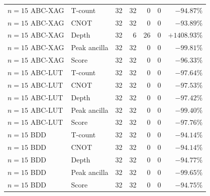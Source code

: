 \begin{tabular}{llrrrrr}
$n=15$ ABC-XAG & T-count & 32 & 32 & 0 & 0 & $-94.87\%$ \\
$n=15$ ABC-XAG & CNOT & 32 & 32 & 0 & 0 & $-93.89\%$ \\
$n=15$ ABC-XAG & Depth & 32 & 6 & 26 & 0 & $+1408.93\%$ \\
$n=15$ ABC-XAG & Peak ancilla & 32 & 32 & 0 & 0 & $-99.81\%$ \\
$n=15$ ABC-XAG & Score & 32 & 32 & 0 & 0 & $-96.33\%$ \\
$n=15$ ABC-LUT & T-count & 32 & 32 & 0 & 0 & $-97.64\%$ \\
$n=15$ ABC-LUT & CNOT & 32 & 32 & 0 & 0 & $-97.53\%$ \\
$n=15$ ABC-LUT & Depth & 32 & 32 & 0 & 0 & $-97.42\%$ \\
$n=15$ ABC-LUT & Peak ancilla & 32 & 32 & 0 & 0 & $-99.40\%$ \\
$n=15$ ABC-LUT & Score & 32 & 32 & 0 & 0 & $-97.76\%$ \\
$n=15$ BDD & T-count & 32 & 32 & 0 & 0 & $-94.14\%$ \\
$n=15$ BDD & CNOT & 32 & 32 & 0 & 0 & $-94.14\%$ \\
$n=15$ BDD & Depth & 32 & 32 & 0 & 0 & $-94.77\%$ \\
$n=15$ BDD & Peak ancilla & 32 & 32 & 0 & 0 & $-99.65\%$ \\
$n=15$ BDD & Score & 32 & 32 & 0 & 0 & $-94.75\%$ \\
\bottomrule
\end{tabular}
